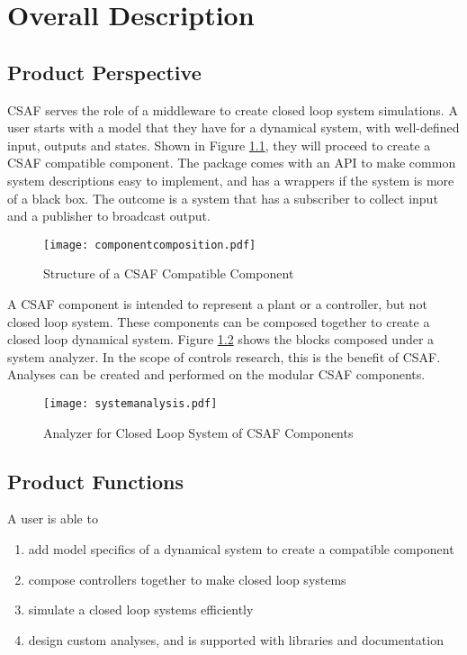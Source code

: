 \chapter{Overall Description}

\section{Product Perspective}

CSAF serves the role of a middleware to create closed loop system simulations. A user starts with a model that they have for a dynamical system, with well-defined input, outputs and states. Shown in Figure \ref{fig:ccomp}, they will proceed to create a CSAF compatible component. The package comes with an API to make common system descriptions easy to implement, and has a wrappers if the system is more of a black box. The outcome is a system that has a subscriber to collect input and a publisher to broadcast output. \\

\begin{figure}
\centering
\texttt{[image: componentcomposition.pdf]}
\caption{Structure of a CSAF Compatible Component}
\label{fig:ccomp}
\end{figure}

A CSAF component is intended to represent a plant or a controller, but not closed loop system. These components can be composed together to create a closed loop dynamical system. Figure \ref{fig:csys} shows the blocks composed under a system analyzer. In the scope of controls research, this is the benefit of CSAF. Analyses can be created and performed on the modular CSAF components. \\

\begin{figure}
\centering
\texttt{[image: systemanalysis.pdf]}
\caption{Analyzer for Closed Loop System of CSAF Components }
\label{fig:csys}
\end{figure}


\section{Product Functions}

A user is able to

\begin{enumerate}
\item add model specifics of a dynamical system to create a compatible component
\item compose controllers together to make closed loop systems
\item simulate a closed loop systems efficiently
\item design custom analyses, and is supported with libraries and documentation
\end{enumerate}

